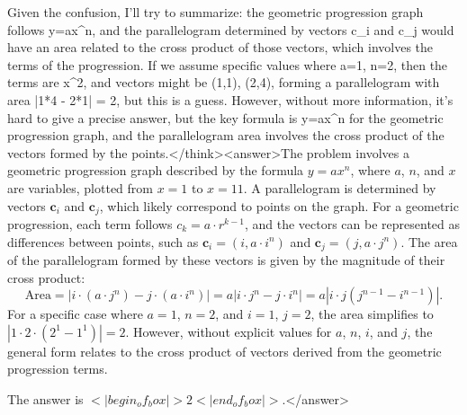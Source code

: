 Given the confusion, I'll try to summarize: the geometric progression graph follows y=ax^n, and the parallelogram determined by vectors c_i and c_j would have an area related to the cross product of those vectors, which involves the terms of the progression. If we assume specific values where a=1, n=2, then the terms are x^2, and vectors might be (1,1), (2,4), forming a parallelogram with area |1*4 - 2*1| = 2, but this is a guess. However, without more information, it's hard to give a precise answer, but the key formula is y=ax^n for the geometric progression graph, and the parallelogram area involves the cross product of the vectors formed by the points.</think><answer>The problem involves a geometric progression graph described by the formula \( y = ax^n \), where \( a \), \( n \), and \( x \) are variables, plotted from \( x = 1 \) to \( x = 11 \). A parallelogram is determined by vectors \( \mathbf{c}_i \) and \( \mathbf{c}_j \), which likely correspond to points on the graph. For a geometric progression, each term follows \( c_k = a \cdot r^{k-1} \), and the vectors can be represented as differences between points, such as \( \mathbf{c}_i = (i, a \cdot i^n) \) and \( \mathbf{c}_j = (j, a \cdot j^n) \). The area of the parallelogram formed by these vectors is given by the magnitude of their cross product:  
\[
\text{Area} = |i \cdot (a \cdot j^n) - j \cdot (a \cdot i^n)| = a|i \cdot j^n - j \cdot i^n| = a|i \cdot j (j^{n-1} - i^{n-1})|.
\]  
For a specific case where \( a = 1 \), \( n = 2 \), and \( i = 1 \), \( j = 2 \), the area simplifies to \( |1 \cdot 2 \cdot (2^1 - 1^1)| = 2 \). However, without explicit values for \( a \), \( n \), \( i \), and \( j \), the general form relates to the cross product of vectors derived from the geometric progression terms.  

The answer is \(<|begin_of_box|>2<|end_of_box|>\).</answer>